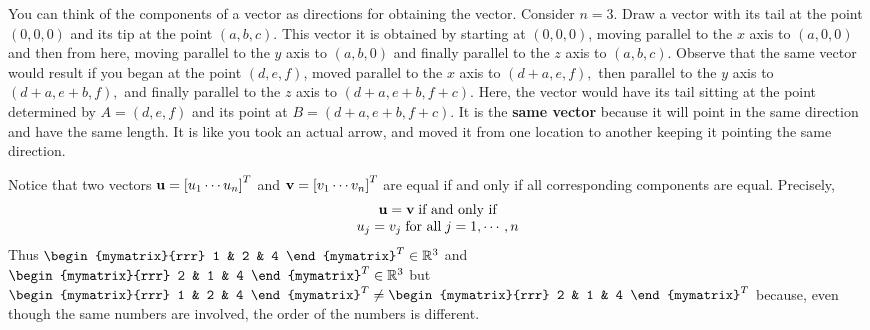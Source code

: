 You can think of the components of a vector as directions for
obtaining the vector. Consider $n=3$.  Draw a vector with its tail at
the point $\left( 0,0,0\right) $ and its tip at the point $\left(
a,b,c\right) $. This vector it is obtained by starting at $\left(
0,0,0\right) $, moving parallel to the $x$ axis to $\left(
a,0,0\right) $ and then from here, moving parallel to the $y$ axis to
$\left( a,b,0\right) $ and finally parallel to the $z$ axis to $\left(
a,b,c\right). $ Observe that the same vector would result if you began
at the point $ \left( d,e,f \right)$, moved parallel to the $x$ axis
to $\left( d+a,e,f\right) ,$ then parallel to the $y$ axis to $\left(
d+a,e+b,f\right) ,$ and finally parallel to the $z$ axis to $\left(
d+a,e+b,f+c\right)$. Here, the vector would have its tail sitting at
the point determined by $A= \left( d,e,f\right) $ and its point at
$B=\left( d+a,e+b,f+c\right)$. It is the \textbf{same vector} because
it will point in the same direction and have the same length. It is
like you took an actual arrow, and moved it from one location to another keeping it pointing
the same direction.

Notice that two vectors ${\bf u} = \left[u_{1} \cdots u_{n}\right]^T $ and
${\bf v}=\left[v_{1} \cdots v_{n}\right]^T$ are equal if and only if
all corresponding components are equal. Precisely,
\begin{equation*}
\begin{array}{c}
{\bf u}={\bf v} \; \mbox{if and only if}\\
u_{j}=v_{j} \; \mbox{for all}\; j=1,\cdots ,n
\end{array}
\end{equation*} 
Thus 
$\begin{mymatrix}{rrr}
1  & 2 & 4
\end{mymatrix}^T \in \R^{3}$ and $\begin{mymatrix}{rrr}
2 & 1 & 4
\end{mymatrix}^T \in
\R^{3}$ but $\begin{mymatrix}{rrr}
1 & 2 & 4
\end{mymatrix}^T \neq \begin{mymatrix}{rrr}
2 & 1 & 4
\end{mymatrix}^T $ because,
even though the same numbers are involved, the order of the numbers is different. 
